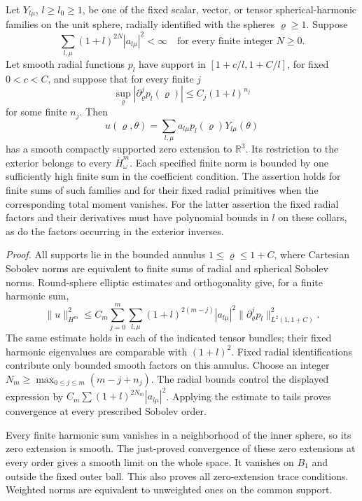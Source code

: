 \documentclass[
  english,
  11pt,
  reqno]{amsart}
\begin{document}
Let \(Y_{l\mu}\), \(l\ge l_0\ge1\), be one of the fixed scalar, vector,
or tensor spherical-harmonic families on the unit sphere, radially
identified with the spheres \(\varrho\ge1\). Suppose%
 \[
\sum_{l,\mu}(1+l)^{2N}|a_{l\mu}|^2<\infty
\quad\text{for every finite integer }N\ge0.
\] Let smooth radial functions \(p_l\) have support in
\([1+c/l,1+C/l]\), for fixed \(0<c<C\), and suppose that for every
finite \(j\)%
 \[
\sup_\varrho|\partial_\varrho^jp_l(\varrho)|
\le C_j(1+l)^{n_j}
\] for some finite \(n_j\). Then \[
u(\varrho,\theta)=
\sum_{l,\mu}a_{l\mu}p_l(\varrho)Y_{l\mu}(\theta)
\] has a smooth compactly supported zero extension to \(\mathbb R^3\).
Its restriction to the exterior belongs to every
\(\overline H^m_\omega\). Each specified finite norm is bounded by one
sufficiently high finite sum in the coefficient condition. The assertion
holds for finite sums of such families and for their fixed radial
primitives when the corresponding total moment vanishes. For the latter
assertion the fixed radial factors and their derivatives must have
polynomial bounds in \(l\) on these collars, as do the factors occurring
in the exterior inverses.

\emph{Proof.} All supports lie in the bounded annulus
\(1\le\varrho\le1+C\), where Cartesian Sobolev norms are equivalent to
finite sums of radial and spherical Sobolev norms. Round-sphere elliptic
estimates and orthogonality give, for a finite harmonic sum,%
 \[
\|u\|_{H^m}^2
\le C_m\sum_{j=0}^m\sum_{l,\mu}
(1+l)^{2(m-j)}|a_{l\mu}|^2
\|\partial_\varrho^jp_l\|_{L^2(1,1+C)}^2.
\] The same estimate holds in each of the indicated tensor bundles;
their fixed harmonic eigenvalues are comparable with \((1+l)^2\). Fixed
radial identifications contribute only bounded smooth factors on this
annulus. Choose an integer \(N_m\ge\max_{0\le j\le m}(m-j+n_j)\). The
radial bounds control the displayed expression by
\(C_m\sum(1+l)^{2N_m}|a_{l\mu}|^2\). Applying the estimate to tails
proves convergence at every prescribed Sobolev order.

Every finite harmonic sum vanishes in a neighborhood of the inner
sphere, so its zero extension is smooth. The just-proved convergence of
these zero extensions at every order gives a smooth limit on the whole
space. It vanishes on \(B_1\) and outside the fixed outer ball. This
also proves all zero-extension trace conditions. Weighted norms are
equivalent to unweighted ones on the common support.
\end{document}
